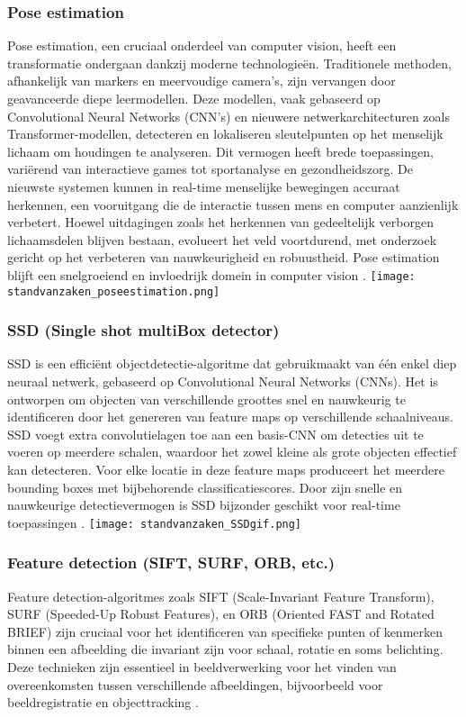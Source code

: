 \subsubsection{Pose estimation}
Pose estimation, een cruciaal onderdeel van computer vision, heeft een transformatie ondergaan dankzij moderne technologieën. Traditionele methoden, afhankelijk van markers en meervoudige camera's, zijn vervangen door geavanceerde diepe leermodellen. Deze modellen, vaak gebaseerd op Convolutional Neural Networks (CNN's) en nieuwere netwerkarchitecturen zoals Transformer-modellen, detecteren en lokaliseren sleutelpunten op het menselijk lichaam om houdingen te analyseren. Dit vermogen heeft brede toepassingen, variërend van interactieve games tot sportanalyse en gezondheidszorg.
De nieuwste systemen kunnen in real-time menselijke bewegingen accuraat herkennen, een vooruitgang die de interactie tussen mens en computer aanzienlijk verbetert. Hoewel uitdagingen zoals het herkennen van gedeeltelijk verborgen lichaamsdelen blijven bestaan, evolueert het veld voortdurend, met onderzoek gericht op het verbeteren van nauwkeurigheid en robuustheid. Pose estimation blijft een snelgroeiend en invloedrijk domein in computer vision \autocite{zheng2020deep}.
\newline
\texttt{[image: standvanzaken\_poseestimation.png]}
\newline
\subsubsection{SSD (Single shot multiBox detector)}
SSD is een efficiënt objectdetectie-algoritme dat gebruikmaakt van één enkel diep neuraal netwerk, gebaseerd op Convolutional Neural Networks (CNNs). 
Het is ontworpen om objecten van verschillende groottes snel en nauwkeurig te identificeren door het genereren van feature maps op verschillende schaalniveaus. 
SSD voegt extra convolutielagen toe aan een basis-CNN om detecties uit te voeren op meerdere schalen, waardoor het zowel kleine als grote objecten effectief kan detecteren. 
Voor elke locatie in deze feature maps produceert het meerdere bounding boxes met bijbehorende classificatiescores. 
Door zijn snelle en nauwkeurige detectievermogen is SSD bijzonder geschikt voor real-time toepassingen \autocite{kumar2020object}.
\newline
\texttt{[image: standvanzaken\_SSDgif.png]}
\newline
\subsubsection{Feature detection (SIFT, SURF, ORB, etc.)}
Feature detection-algoritmes zoals SIFT (Scale-Invariant Feature Transform), SURF (Speeded-Up Robust Features), en ORB (Oriented FAST and Rotated BRIEF) zijn cruciaal voor het identificeren van specifieke punten of kenmerken binnen een afbeelding die invariant zijn voor schaal, rotatie en soms belichting. Deze technieken zijn essentieel in beeldverwerking voor het vinden van overeenkomsten tussen verschillende afbeeldingen, bijvoorbeeld voor beeldregistratie en objecttracking \autocite{tareen2018comparative}.

